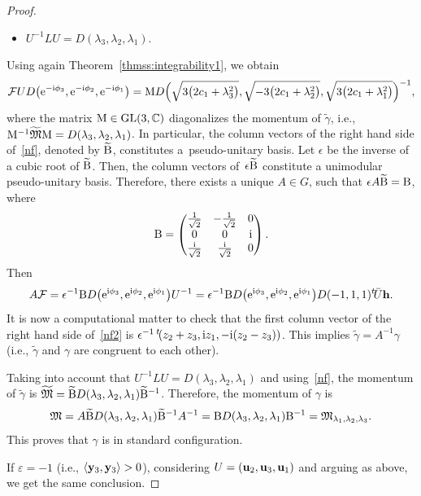 \documentclass[10pt,a4paper]{amsart}
\numberwithin{equation}{section}
\def\C{\mathbb{C}}
\begin{document}
\begin{proof}
\begin{itemize}
\item ${U}^{-1}{L}{U}=D(\lambda_3,\lambda_2,\lambda_1)$.
\end{itemize}
Using again Theorem~\ref{thmss:integrability1}, we obtain
\begin{gather}\label{nf}
{\mathcal F} {U} D\big({\rm e}^{-{\rm i}\phi_3}, {\rm e}^{-{\rm i}\phi_2}, {\rm e}^{-{\rm i}\phi_1}\big)=
{\rm M}D\Big(\sqrt{3\big(2c_1+\lambda_3^2\big)}, \sqrt{-3\big(2c_1+\lambda_2^2\big)}, \sqrt{3\big(2c_1+\lambda_1^2\big)}\Big)^{-1},
 \end{gather}
where the matrix ${\rm M}\in {\rm GL}(3,\C)$ diagonalizes the momentum of $\widetilde{\gamma}$, i.e.,
${\rm M}^{-1}\widetilde{{\mathfrak M}}{\rm M}=
D(\lambda_3,\lambda_2,\lambda_1)$.
In particular, the column vectors of the right hand side of~\eqref{nf}, denoted by $\widetilde{{\rm B}}$,
constitutes a~pseudo-unitary basis. Let $\epsilon$ be the inverse of a cubic root of ${\widetilde{\rm B}}$.
Then, the column vectors of~$\epsilon {\widetilde{\rm B}}$ constitute a unimodular pseudo-unitary basis.
Therefore, there exists a unique ${A}\in {G}$, such that
$\epsilon {A}{\widetilde{\rm B}}={\rm B}$, where
%
\begin{equation}\label{standardpsh}
 {\rm B}=\begin{pmatrix}
 \frac{1}{\sqrt{2} }&-\frac{1}{\sqrt{2}} & 0\\
 0 & 0 &{\rm i}\\
 \frac{{\rm i}}{\sqrt{2}} &\frac{{\rm i}}{\sqrt{2}} & 0\\
 \end{pmatrix}.
 \end{equation}
Then
\begin{equation}\label{nf2}
{A}{\mathcal F}=\epsilon^{-1}{\rm B} D\big({\rm e}^{{\rm i}\phi_3}, {\rm e}^{{\rm i}\phi_2}, {\rm e}^{{\rm i}\phi_1}\big){U}^{-1}=
\epsilon^{-1}{\rm B}D\big({\rm e}^{{\rm i}\phi_3}, {\rm e}^{{\rm i}\phi_2}, {\rm e}^{{\rm i}\phi_1}\big)D(-1,1,1){^t\!{}\bar{U}}{\bf h}.
 \end{equation}
It is now a computational matter to check that the first column vector of the right hand side of~\eqref{nf2} is
$\epsilon^{-1}\,{^t\!(}z_2+z_3, {\rm i}z_1,- {\rm i}(z_2-z_3))$.
This implies $\widetilde{\gamma}={A}^{-1}\gamma$ (i.e., $ \widetilde{\gamma}$ and $\gamma$ are congruent to each other).

Taking into account that ${U}^{-1}{L}{U}=D(\lambda_3,\lambda_2,\lambda_1)$ and using~\eqref{nf}, the momentum
of $\widetilde{\gamma}$ is
$\widetilde{{\mathfrak M}}=\widetilde{{\rm B}}D(\lambda_3,\lambda_2,\lambda_1)\widetilde{{\rm B}}^{-1}$.
Therefore, the momentum of $\gamma$ is
\[
{\mathfrak M}={A}\widetilde{{\rm B}}D(\lambda_3,\lambda_2,\lambda_1)\widetilde{{\rm B}}^{-1}{A}^{-1}=
{\rm B}D(\lambda_3,\lambda_2,\lambda_1){\rm B}^{-1}={\mathfrak M}_{\lambda_1,\lambda_2,\lambda_3}.
\]
This proves that $\gamma$ is in standard configuration.

If $\varepsilon =-1$ (i.e., $\langle {\bf y}_3,{\bf y}_3\rangle>0$), considering ${U}=({\bf u}_2,{\bf u}_3,{\bf u}_1)$
and arguing as above, we get the same conclusion.
\end{proof}
\end{document}
